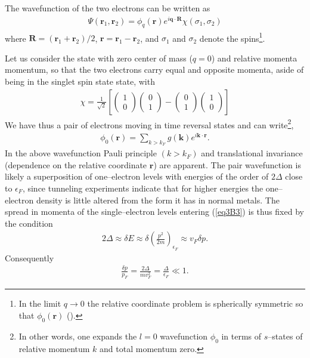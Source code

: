 \begin{subappendices}
The wavefunction of the two electrons can be written as
\begin{align}\label{eq3B1}
\Psi(\mathbf r_1,\mathbf r_2)=\phi_q(\mathbf r)e^{i\mathbf q\cdot\mathbf R}\chi(\sigma_1,\sigma_2)
\end{align}
where $\mathbf R=(\mathbf r_1+\mathbf r_2)/2$, $\mathbf r=\mathbf r_1-\mathbf r_2$, and $\sigma_1$ and $\sigma_2$ denote the spins\footnote{In the limit $q\rightarrow 0$ the relative coordinate problem is spherically symmetric so that $\phi_0(\mathbf r)$ (\cite{Schrieffer:64}).}. 


Let us consider the state with zero center of mass ($q=0$) and relative momenta momentum, so that the two electrons carry  equal and opposite momenta, aside of being in the singlet spin state state, with
\begin{align}\label{eq3B2}
\chi=\frac{1}{\sqrt{2}}\left[
\left(\begin{array}{c}
1\\ 
0
\end{array} \right)
\left(\begin{array}{c}
0\\ 
1
\end{array} \right)-
\left(\begin{array}{c}
0\\ 
1
\end{array} \right)
\left(\begin{array}{c}
1\\ 
0
\end{array} \right)
\right]
\end{align}
 We have thus a pair of electrons moving in time reversal states and can write\footnote{In other words, one expands the $l=0$ wavefunction $\phi_0$ in terms of $s$--states of relative momentum $k$ and total momentum zero.},
\begin{align}\label{eq3B3}
\phi_0(\mathbf r)=\sum_{k>k_F}g(\mathbf k)e^{i\mathbf k\cdot\mathbf r}.
\end{align}
In the above wavefunction Pauli principle $(k>k_F)$ and translational invariance (dependence on the relative coordinate $\mathbf r$) are apparent. The pair wavefunction is likely a superposition of one--electron levels with energies of the order of $2\Delta$ close to $\epsilon_F$, since tunneling experiments indicate that for higher energies the one--electron density is little altered from the form it has in normal metals. The spread in momenta of the single--electron levels entering (\ref{eq3B3}) is thus fixed by the condition 
\begin{align}\label{eq3B4}
2\Delta\approx\delta E\approx\delta \left(\frac{p^2}{2m}\right)_{\epsilon_F}\approx v_F\delta p.
\end{align}
Consequently
\begin{align}\label{eq3B5}
\frac{\delta p}{p_F}=\frac{2\Delta}{mv_F^2}=\frac{\Delta}{\epsilon_F}\ll1.
\end{align}


\end{subappendices}
